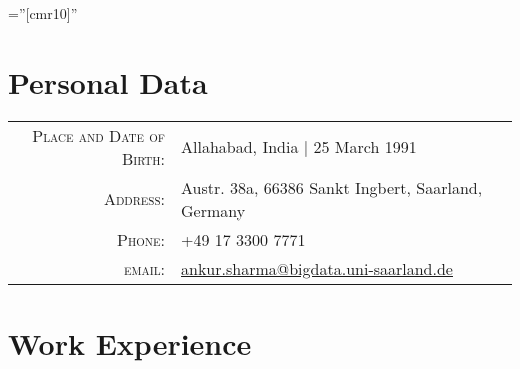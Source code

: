 \documentclass[a4paper,10pt]{article} %
\begin{document}
\pagestyle{empty} %

\font\fb=''[cmr10]'' %

\vspace{-2.5cm}
\par{\bigskip\par} %

\section{Personal Data}

\begin{tabular}{rl}
\textsc{Place and Date of Birth:} & Allahabad, India  | 25 March 1991 \\
\textsc{Address:} & Austr. 38a, 66386 Sankt Ingbert, Saarland, Germany \\
\textsc{Phone:} & +49 17 3300 7771\\
\textsc{email:} & \href{mailto:ankur.sharma@bigdata.uni-saarland.de}{ankur.sharma@bigdata.uni-saarland.de}
\end{tabular}


\section{Work Experience}
\end{document}
